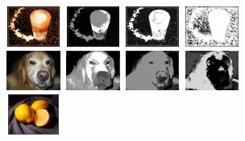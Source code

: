 \documentclass[10pt,twocolumn,letterpaper]{article}
\begin{document}
    \begin{center}
    \includegraphics[width=0.72in,height=0.52in]{./Figures/pydownCompare/1.jpg}
    \includegraphics[width=0.72in,height=0.52in]{./Figures/pydownCompare/1NOPYDOWN.jpg}
    \includegraphics[width=0.72in,height=0.52in]{./Figures/pydownCompare/1PYDOWN.jpg} 
    \includegraphics[width=0.72in,height=0.52in]{./Figures/pydownCompare/1DOUBLEPYDOWN.jpg} \\
    \includegraphics[width=0.72in,height=0.52in]{./Figures/pydownCompare/2.jpg}
    \includegraphics[width=0.72in,height=0.52in]{./Figures/pydownCompare/2NOPYDOWN.jpg}
    \includegraphics[width=0.72in,height=0.52in]{./Figures/pydownCompare/2PYDOWN.jpg} 
    \includegraphics[width=0.72in,height=0.52in]{./Figures/pydownCompare/2DOUBLEPYDOWN.jpg} \\
    \includegraphics[width=0.72in,height=0.52in]{./Figures/pydownCompare/3.jpg}

\end{center}
\end{document}
